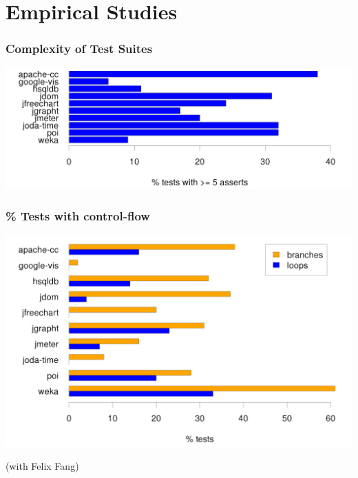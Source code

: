 \documentclass{beamer}
\begin{document}
\section{Empirical Studies}

\begin{frame}
  \frametitle{Complexity of Test Suites}
\begin{center}
\includegraphics[width=\textwidth, height=.8\textheight, keepaspectratio=true]{images/five-asserts.png}
\end{center}
\end{frame}

\begin{frame}
  \frametitle{\% Tests with control-flow}
\begin{center}
\includegraphics[width=\textwidth, height=.8\textheight, keepaspectratio=true]{images/control-flow.png}
\end{center}
\end{frame}

\begin{frame}
\begin{center}
(with Felix Fang)
\end{center}
\end{frame}
\end{document}
